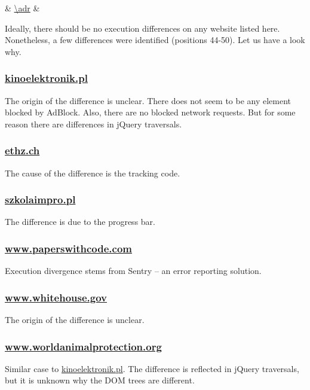%
{\thecsvrow & \url{\adr} & \cnt}%

Ideally, there should be no execution differences on any website listed here. Nonetheless, a few differences were identified (positions 44-50).
Let us have a look why.

\subsubsection{\url{kinoelektronik.pl}}
The origin of the difference is unclear. There does not seem to be any element
blocked by AdBlock. Also, there are no blocked network requests. But for some reason there are differences in
jQuery traversals.

\subsubsection{\url{ethz.ch}}
The cause of the difference is the tracking code.

\subsubsection{\url{szkolaimpro.pl}}
The difference is due to the progress bar.

\subsubsection{\url{www.paperswithcode.com}}
Execution divergence stems from Sentry -- an error reporting solution.

\subsubsection{\url{www.whitehouse.gov}}
The origin of the difference is unclear.

\subsubsection{\url{www.worldanimalprotection.org}}
Similar case to \url{kinoelektronik.pl}. The difference is reflected in jQuery traversals,
but it is unknown why the DOM trees are different.

